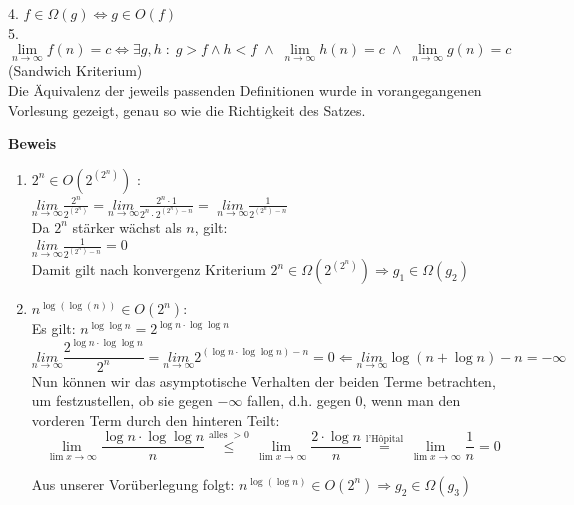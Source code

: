 \documentclass[11pt,a4paper,ngerman]{article}
\begin{document}
4. $f \in \Omega (g) \Leftrightarrow g \in O (f)$\\
5. $\underset{n \rightarrow \infty}{\lim} f(n) = c \Leftrightarrow \exists g,h \; : \; g > f \land h < f \; \land \; \underset{n \rightarrow \infty}{\lim} h(n) = c \; \land \; \underset{n \rightarrow \infty}{\lim} g(n) = c $ (Sandwich Kriterium)\\

Die Äquivalenz der jeweils passenden Definitionen wurde in vorangegangenen Vorlesung gezeigt, genau so wie die Richtigkeit des Satzes.

\begin{description}
\item{\textbf{Beweis}} 
\begin{enumerate}[\bfseries 1.]

\item
$  2^n  \in O (2^{(2^n)})$ : \\
$\underset{n\rightarrow\infty}{lim} \frac{2^n}{2^{(2^n)}} = \underset{n\rightarrow\infty}{lim} \frac{2^n \cdot 1}{2^n \cdot 2^{(2^n) - n}} = $
$ \underset{n\rightarrow\infty}{lim} \frac{1}{2^{(2^n) - n}}$\\
Da $2^n$ stärker wächst als $n$, gilt:\\
$ \underset{n\rightarrow\infty}{lim} \frac{1}{2^{(2^n) - n}} = 0$\\
Damit gilt nach konvergenz Kriterium $2^n \in \Omega (2^{(2^n)})\Rightarrow g_1 \in \Omega (g_{2})$

\item
$ n^{\log{(\log{(n)})}} \in O (2^n)$: \\
Es gilt: $n^{\log \log n} = 2^{\log n \cdot \log \log n}$\\
$$
\underset{n\rightarrow\infty}{lim} \frac{ 2^{\log n \cdot \log \log n}}{2^n} = \underset{n\rightarrow\infty}{lim}  2^{(\log n \cdot \log \log n )- n} = 0 \Leftarrow \underset{n\rightarrow\infty}{lim} \log (n + \log n) - n = - \infty
$$
Nun können wir das asymptotische Verhalten der beiden Terme betrachten, um festzustellen, ob sie gegen $-\infty$ fallen, d.h. gegen 0, wenn man den vorderen Term durch den hinteren Teilt:\\
$$
\underset{\lim x \rightarrow \infty}{\lim} \frac{\log n \cdot \log \log n}{n} \stackrel{\text{alles }>0}{\leq} \underset{\lim x \rightarrow \infty}{\lim} \frac{2 \cdot \log n}{n} \stackrel{\text{l'Hôpital}}{=}  \underset{\lim x \rightarrow \infty}{\lim} \frac{1}{n} = 0
$$

Aus unserer Vorüberlegung folgt: $n^{\log (\log n)} \in O(2^n) \Rightarrow g_2 \in \Omega (g_3)$


\end{enumerate}
\end{description}
\end{document}
